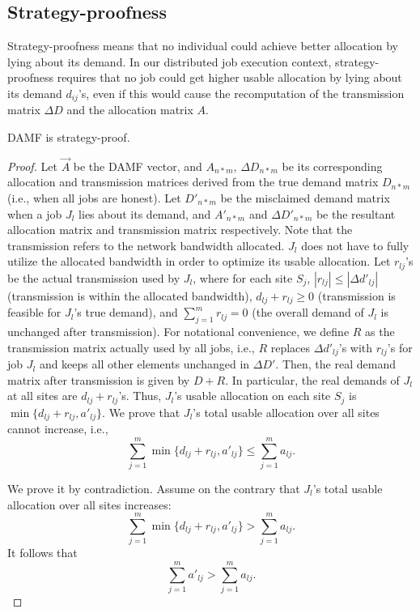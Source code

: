 \subsection{Strategy-proofness}
Strategy-proofness means that no individual could achieve better allocation by lying about its demand. In our distributed job execution context, strategy-proofness requires that no job could get higher usable allocation by lying about its demand $d_{ij}$'s, even if this would cause the recomputation of the transmission matrix $\Delta D$ and the allocation matrix $A$.

\begin{theorem}
    DAMF is strategy-proof.
\end{theorem}

\begin{proof}
Let $\vec A$ be the DAMF vector, and $A_{n*m}$, $\Delta D_{n*m}$ be its corresponding allocation and transmission matrices derived from the true demand matrix $D_{n*m}$ (i.e., when all jobs are honest). Let $D'_{n*m}$ be the misclaimed demand matrix when a job $J_l$ lies about its demand, and $A'_{n*m}$ and $\Delta D'_{n*m}$ be the resultant allocation matrix and transmission matrix respectively. Note that the transmission refers to the network bandwidth allocated. $J_l$ does not have to fully utilize the allocated bandwidth in order to optimize its usable allocation. Let $r_{lj}$'s be the actual transmission used by $J_l$, where for each site $S_j$, $|r_{lj}| \leq |\Delta d'_{lj}|$ (transmission is within the allocated bandwidth), $d_{lj} + r_{lj} \geq 0$ (transmission is feasible for $J_l$'s true demand), and $\sum_{j=1}^m r_{lj} = 0$ (the overall demand of $J_l$ is unchanged after transmission). For notational convenience, we define $R$ as the transmission matrix actually used by all jobs, i.e., $R$ replaces $\Delta d'_{lj}$'s with $r_{lj}$'s for job $J_l$ and keeps all other elements unchanged in $\Delta D'$. Then, the real demand matrix after transmission is given by $D + R$. In particular, the real demands of $J_l$ at all sites are $d_{lj} + r_{lj}$'s. Thus, $J_l$'s usable allocation on each site $S_j$ is $\min\{d_{lj}+r_{lj}, a'_{lj}\}$. We prove that $J_l$'s total usable allocation over all sites cannot increase, i.e.,
$$
\sum_{j=1}^m \min\{d_{lj}+r_{lj}, a'_{lj}\} \leq \sum_{j=1}^m a_{lj}. 
$$

We prove it by contradiction. Assume on the contrary that $J_l$'s total usable allocation over all sites increases: 
\begin{equation}
\sum_{j=1}^m \min\{d_{lj}+r_{lj}, a'_{lj}\} > \sum_{j=1}^m a_{lj}.
\label{eq:strategy1}
\end{equation}
It follows that 
\begin{equation}
\sum_{j=1}^m a'_{lj} >\sum_{j=1}^m a_{lj}.
\label{eq:strategy4}
\end{equation}


\end{proof}
